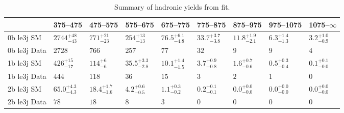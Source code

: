 \begin{center}
\begin{table}[h!]
  \caption{Summary of hadronic yields from fit.}
  \label{tab:ensemble-summary-posteriori}
  \centering
  \scriptsize
\begin{tabular}{ lllllllll }

\hline
& 375--475                       & 475--575                       & 575--675                       & 675--775                       & 775--875                       & 875--975                       & 975--1075                      & 1075--$\infty$                 \\ [1.000000ex]
\hline
0b le3j SM \T   & $2744^{+48}_{-43}$             & $771^{+21}_{-23}$              & $254^{+13}_{-13}$              & $76.5^{+6.1}_{-4.8}$           & $33.7^{+3.7}_{-3.8}$           & $11.8^{+1.9}_{-2.1}$           & $6.3^{+1.4}_{-1.3}$            & $3.2^{+1.0}_{-0.9}$            \\ 
0b le3j Data \T & $2728$                         & $766$                          & $257$                          & $77$                           & $32$                           & $9$                            & $9$                            & $4$                            \\ 
\hline
1b le3j SM \T   & $426^{+15}_{-17}$              & $114^{+6}_{-6}$                & $35.5^{+3.3}_{-2.8}$           & $10.1^{+1.4}_{-1.5}$           & $3.7^{+0.9}_{-0.8}$            & $1.6^{+0.7}_{-0.6}$            & $0.5^{+0.3}_{-0.4}$            & $0.1^{+0.1}_{-0.0}$            \\ 
1b le3j Data \T & $444$                          & $118$                          & $36$                           & $15$                           & $3$                            & $2$                            & $1$                            & $0$                            \\ 
\hline
2b le3j SM \T   & $65.0^{+4.3}_{-4.3}$           & $18.4^{+1.7}_{-1.6}$           & $4.2^{+0.6}_{-0.5}$            & $1.1^{+0.3}_{-0.2}$            & $0.2^{+0.1}_{-0.1}$            & $0.0^{+0.0}_{-0.0}$            & $0.0^{+0.0}_{-0.0}$            & $0.0^{+0.0}_{-0.0}$            \\ 
2b le3j Data \T & $78$                           & $18$                           & $8$                            & $3$                            & $0$                            & $0$                            & $0$                            & $0$                            \\ 

\end{tabular}
\end{table}
\end{center}
